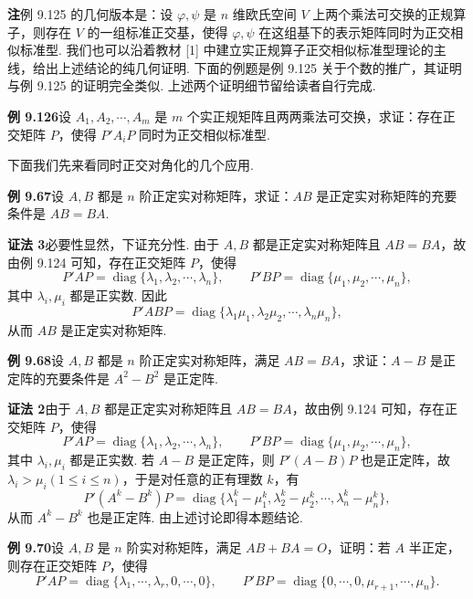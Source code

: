 \documentclass[UTF8, 12pt, fontset=fandol, oneside]{ctexart}
\begin{document}
\noindent\textbf{注}\quad 例 9.125 的几何版本是：设 $\varphi,\psi$ 是 $n$ 维欧氏空间 $V$ 上两个乘法可交换的正规算子，则存在 $V$ 的一组标准正交基，使得 $\varphi,\psi$ 在这组基下的表示矩阵同时为正交相似标准型. 我们也可以沿着教材 [1] 中建立实正规算子正交相似标准型理论的主线，给出上述结论的纯几何证明. 下面的例题是例 9.125 关于个数的推广，其证明与例 9.125 的证明完全类似. 上述两个证明细节留给读者自行完成.

\noindent\textbf{例 9.126}\quad 设 $A_1,A_2,\cdots,A_m$ 是 $m$ 个实正规矩阵且两两乘法可交换，求证：存在正交矩阵 $P$，使得 $P'A_iP$ 同时为正交相似标准型.

下面我们先来看同时正交对角化的几个应用.

\noindent\textbf{例 9.67}\quad 设 $A,B$ 都是 $n$ 阶正定实对称矩阵，求证：$AB$ 是正定实对称矩阵的充要条件是 $AB=BA$.

\noindent\textbf{证法 3}\quad 必要性显然，下证充分性. 由于 $A,B$ 都是正定实对称矩阵且 $AB=BA$，故由例 9.124 可知，存在正交矩阵 $P$，使得
\[
P'AP=\operatorname{diag}\{\lambda_1,\lambda_2,\cdots,\lambda_n\},\qquad
P'BP=\operatorname{diag}\{\mu_1,\mu_2,\cdots,\mu_n\},
\]
其中 $\lambda_i,\mu_i$ 都是正实数. 因此
\[
P'ABP=\operatorname{diag}\{\lambda_1\mu_1,\lambda_2\mu_2,\cdots,\lambda_n\mu_n\},
\]
从而 $AB$ 是正定实对称矩阵.

\noindent\textbf{例 9.68}\quad 设 $A,B$ 都是 $n$ 阶正定实对称矩阵，满足 $AB=BA$，求证：$A-B$ 是正定阵的充要条件是 $A^2-B^2$ 是正定阵.

\noindent\textbf{证法 2}\quad 由于 $A,B$ 都是正定实对称矩阵且 $AB=BA$，故由例 9.124 可知，存在正交矩阵 $P$，使得
\[
P'AP=\operatorname{diag}\{\lambda_1,\lambda_2,\cdots,\lambda_n\},\qquad
P'BP=\operatorname{diag}\{\mu_1,\mu_2,\cdots,\mu_n\},
\]
其中 $\lambda_i,\mu_i$ 都是正实数. 若 $A-B$ 是正定阵，则 $P'(A-B)P$ 也是正定阵，故 $\lambda_i>\mu_i(1\le i\le n)$，于是对任意的正有理数 $k$，有
\[
P'(A^k-B^k)P=\operatorname{diag}\{\lambda_1^k-\mu_1^k,\lambda_2^k-\mu_2^k,\cdots,\lambda_n^k-\mu_n^k\},
\]
从而 $A^k-B^k$ 也是正定阵. 由上述讨论即得本题结论.

\noindent\textbf{例 9.70}\quad 设 $A,B$ 是 $n$ 阶实对称矩阵，满足 $AB+BA=O$，证明：若 $A$ 半正定，则存在正交矩阵 $P$，使得
\[
P'AP=\operatorname{diag}\{\lambda_1,\cdots,\lambda_r,0,\cdots,0\},\qquad
P'BP=\operatorname{diag}\{0,\cdots,0,\mu_{r+1},\cdots,\mu_n\}.
\]
\end{document}
